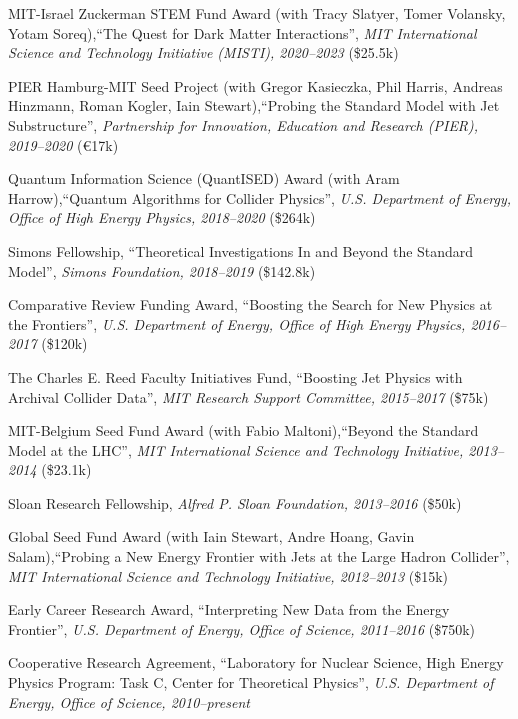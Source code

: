 \item MIT-Israel Zuckerman STEM Fund Award (with Tracy Slatyer, Tomer Volansky, Yotam Soreq),``The Quest for Dark Matter Interactions'', \textit{MIT International Science and Technology Initiative (MISTI), 2020--2023}
(\$25.5k)
\item PIER Hamburg-MIT Seed Project (with Gregor Kasieczka, Phil Harris, Andreas Hinzmann, Roman Kogler, Iain Stewart),``Probing the Standard Model with Jet Substructure'', \textit{Partnership for Innovation, Education and Research (PIER), 2019--2020}
(\euro17k)
\item Quantum Information Science (QuantISED) Award (with Aram Harrow),``Quantum Algorithms for Collider Physics'', \textit{U.S. Department of Energy, Office of High Energy Physics, 2018--2020}
(\$264k)
\item Simons Fellowship, ``Theoretical Investigations In and Beyond the Standard Model'', \textit{Simons Foundation, 2018--2019}
(\$142.8k)
\item Comparative Review Funding Award, ``Boosting the Search for New Physics at the Frontiers'', \textit{U.S. Department of Energy, Office of High Energy Physics, 2016--2017}
(\$120k)
\item The Charles E. Reed Faculty Initiatives Fund, ``Boosting Jet Physics with Archival Collider Data'', \textit{MIT Research Support Committee, 2015--2017}
(\$75k)
\item MIT-Belgium Seed Fund Award (with Fabio Maltoni),``Beyond the Standard Model at the LHC'', \textit{MIT International Science and Technology Initiative, 2013--2014}
(\$23.1k)
\item Sloan Research Fellowship, \textit{Alfred P. Sloan Foundation, 2013--2016}
(\$50k)
\item Global Seed Fund Award (with Iain Stewart, Andre Hoang, Gavin Salam),``Probing a New Energy Frontier with Jets at the Large Hadron Collider'', \textit{MIT International Science and Technology Initiative, 2012--2013}
(\$15k)
\item Early Career Research Award, ``Interpreting New Data from the Energy Frontier'', \textit{U.S. Department of Energy, Office of Science, 2011--2016}
(\$750k)
\item Cooperative Research Agreement, ``Laboratory for Nuclear Science, High Energy Physics Program: Task C, Center for Theoretical Physics'', \textit{U.S. Department of Energy, Office of Science, 2010--present}

\el
